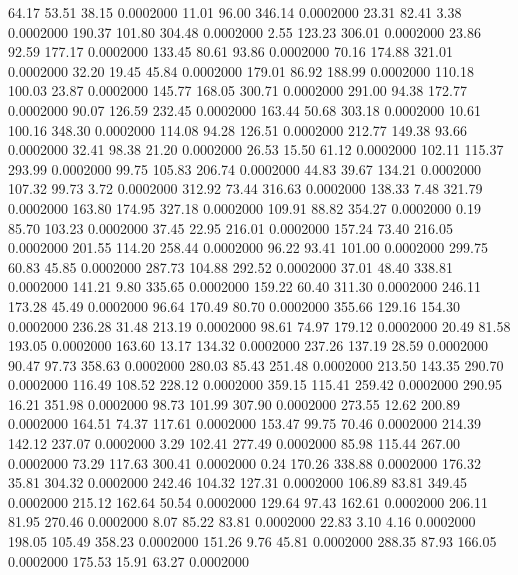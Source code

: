   64.17   53.51   38.15   0.0002000
  11.01   96.00  346.14   0.0002000
  23.31   82.41    3.38   0.0002000
 190.37  101.80  304.48   0.0002000
   2.55  123.23  306.01   0.0002000
  23.86   92.59  177.17   0.0002000
 133.45   80.61   93.86   0.0002000
  70.16  174.88  321.01   0.0002000
  32.20   19.45   45.84   0.0002000
 179.01   86.92  188.99   0.0002000
 110.18  100.03   23.87   0.0002000
 145.77  168.05  300.71   0.0002000
 291.00   94.38  172.77   0.0002000
  90.07  126.59  232.45   0.0002000
 163.44   50.68  303.18   0.0002000
  10.61  100.16  348.30   0.0002000
 114.08   94.28  126.51   0.0002000
 212.77  149.38   93.66   0.0002000
  32.41   98.38   21.20   0.0002000
  26.53   15.50   61.12   0.0002000
 102.11  115.37  293.99   0.0002000
  99.75  105.83  206.74   0.0002000
  44.83   39.67  134.21   0.0002000
 107.32   99.73    3.72   0.0002000
 312.92   73.44  316.63   0.0002000
 138.33    7.48  321.79   0.0002000
 163.80  174.95  327.18   0.0002000
 109.91   88.82  354.27   0.0002000
   0.19   85.70  103.23   0.0002000
  37.45   22.95  216.01   0.0002000
 157.24   73.40  216.05   0.0002000
 201.55  114.20  258.44   0.0002000
  96.22   93.41  101.00   0.0002000
 299.75   60.83   45.85   0.0002000
 287.73  104.88  292.52   0.0002000
  37.01   48.40  338.81   0.0002000
 141.21    9.80  335.65   0.0002000
 159.22   60.40  311.30   0.0002000
 246.11  173.28   45.49   0.0002000
  96.64  170.49   80.70   0.0002000
 355.66  129.16  154.30   0.0002000
 236.28   31.48  213.19   0.0002000
  98.61   74.97  179.12   0.0002000
  20.49   81.58  193.05   0.0002000
 163.60   13.17  134.32   0.0002000
 237.26  137.19   28.59   0.0002000
  90.47   97.73  358.63   0.0002000
 280.03   85.43  251.48   0.0002000
 213.50  143.35  290.70   0.0002000
 116.49  108.52  228.12   0.0002000
 359.15  115.41  259.42   0.0002000
 290.95   16.21  351.98   0.0002000
  98.73  101.99  307.90   0.0002000
 273.55   12.62  200.89   0.0002000
 164.51   74.37  117.61   0.0002000
 153.47   99.75   70.46   0.0002000
 214.39  142.12  237.07   0.0002000
   3.29  102.41  277.49   0.0002000
  85.98  115.44  267.00   0.0002000
  73.29  117.63  300.41   0.0002000
   0.24  170.26  338.88   0.0002000
 176.32   35.81  304.32   0.0002000
 242.46  104.32  127.31   0.0002000
 106.89   83.81  349.45   0.0002000
 215.12  162.64   50.54   0.0002000
 129.64   97.43  162.61   0.0002000
 206.11   81.95  270.46   0.0002000
   8.07   85.22   83.81   0.0002000
  22.83    3.10    4.16   0.0002000
 198.05  105.49  358.23   0.0002000
 151.26    9.76   45.81   0.0002000
 288.35   87.93  166.05   0.0002000
 175.53   15.91   63.27   0.0002000
